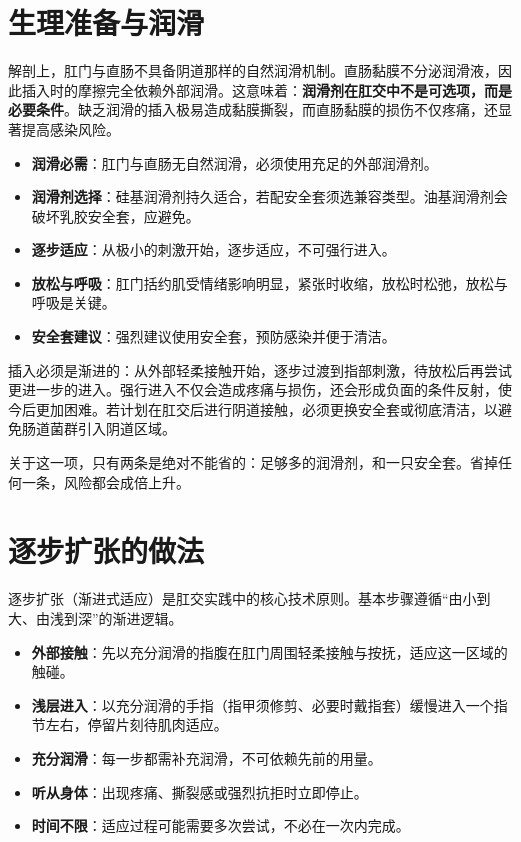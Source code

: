 \documentclass[12pt,UTF8]{ctexbook}
\begin{document}
\section{生理准备与润滑}

解剖上，肛门与直肠不具备阴道那样的自然润滑机制。直肠黏膜不分泌润滑液，因此插入时的摩擦完全依赖外部润滑。这意味着：\textbf{润滑剂在肛交中不是可选项，而是必要条件}。缺乏润滑的插入极易造成黏膜撕裂，而直肠黏膜的损伤不仅疼痛，还显著提高感染风险。

\begin{itemize}
\item \textbf{润滑必需}：肛门与直肠无自然润滑，必须使用充足的外部润滑剂。
\item \textbf{润滑剂选择}：硅基润滑剂持久适合，若配安全套须选兼容类型。油基润滑剂会破坏乳胶安全套，应避免。
\item \textbf{逐步适应}：从极小的刺激开始，逐步适应，不可强行进入。
\item \textbf{放松与呼吸}：肛门括约肌受情绪影响明显，紧张时收缩，放松时松弛，放松与呼吸是关键。
\item \textbf{安全套建议}：强烈建议使用安全套，预防感染并便于清洁。
\end{itemize}

插入必须是渐进的：从外部轻柔接触开始，逐步过渡到指部刺激，待放松后再尝试更进一步的进入。强行进入不仅会造成疼痛与损伤，还会形成负面的条件反射，使今后更加困难。若计划在肛交后进行阴道接触，必须更换安全套或彻底清洁，以避免肠道菌群引入阴道区域。

\begin{tcolorbox}[colback=pink!5!white,colframe=red!50!black,title=贴心小叮咛]
关于这一项，只有两条是绝对不能省的：足够多的润滑剂，和一只安全套。省掉任何一条，风险都会成倍上升。
\end{tcolorbox}

\section{逐步扩张的做法}

逐步扩张（渐进式适应）是肛交实践中的核心技术原则。基本步骤遵循“由小到大、由浅到深”的渐进逻辑。

\begin{itemize}
\item \textbf{外部接触}：先以充分润滑的指腹在肛门周围轻柔接触与按抚，适应这一区域的触碰。
\item \textbf{浅层进入}：以充分润滑的手指（指甲须修剪、必要时戴指套）缓慢进入一个指节左右，停留片刻待肌肉适应。
\item \textbf{充分润滑}：每一步都需补充润滑，不可依赖先前的用量。
\item \textbf{听从身体}：出现疼痛、撕裂感或强烈抗拒时立即停止。
\item \textbf{时间不限}：适应过程可能需要多次尝试，不必在一次内完成。
\end{itemize}
\end{document}
